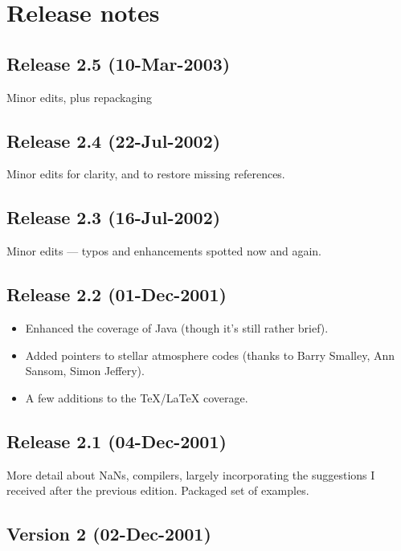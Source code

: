 \documentclass[11pt,oneside,chapters]{starlink}
\begin{document}
\chapter{Release notes}
\label{s:relnotes}

\section{Release 2.5 (10-Mar-2003)}

Minor edits, plus repackaging

\section{Release 2.4 (22-Jul-2002)}

Minor edits for clarity, and to restore missing
references.

\section{Release 2.3 (16-Jul-2002)}

Minor edits --- typos and enhancements spotted now and
again.

\section{Release 2.2 (01-Dec-2001)}
\label{rel-2.2}

\begin{itemize}
\item
Enhanced the coverage of Java (though it's still rather brief).

\item
Added pointers to stellar atmosphere codes (thanks to Barry
Smalley, Ann Sansom, Simon Jeffery).

\item
A few additions to the TeX/LaTeX coverage.
\end{itemize}

\section{Release 2.1 (04-Dec-2001)}
\label{rel-2.1}

More detail about NaNs, compilers, largely incorporating the suggestions
I received after the previous edition.  Packaged set of examples.

\section{Version 2 (02-Dec-2001)}
\label{rel-2.0}
\end{document}
